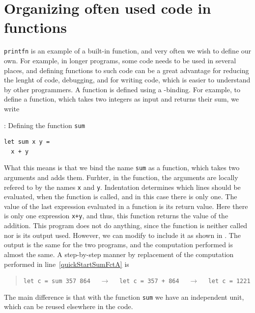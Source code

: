 \documentclass[springer.tex]{subfiles}
\begin{document}
\section{Organizing often used code in functions}
\label{sec:functions}
\lstinline{printfn} is an example of a built-in function, and very often we wish to define our own. For example, in longer programs, some code needs to be used in several places, and defining functions to  such code can be a great advantage for reducing the lenght of code, debugging, and for writing code, which is easier to understand by other programmers. A function is defined using a -binding. For example, to define a function, which takes two integers as input and returns their sum, we write
%
\begin{codeNOutput}[label=sumFunction,
  top=-5pt,
  bottom=-5pt,
  left=-2pt,
  right=-2pt,
]{: Defining the function \lstinline{sum}}
\begin{lstlisting}
let sum x y =
  x + y
\end{lstlisting} 
\end{codeNOutput}
%
What this means is that we bind the name \lstinline{sum} as a function, which takes two arguments and adds them. Furhter, in the function, the arguments are locally refered to by the names \lstinline{x} and \lstinline{y}. Indentation determines which lines should be evaluated, when the function is called, and in this case there is only one. The value of the last expression evaluated in a function is its return value. Here there is only one expression \lstinline{x+y}, and thus, this function returns the value of the addition. This program does not do anything, since the function is neither called nor is its output used. However, we can modify  to include it as shown in .
% 
%
The output is the same for the two programs, and the computation performed is almost the same. A step-by-step manner by replacement of the computation performed in line~\ref{quickStartSumFctA} is
\begin{quote}
  \lstinline{let c = sum 357 864} $\quad\rightarrow\quad$  \lstinline{let c = 357 + 864}  $\quad\rightarrow\quad$  \lstinline{let c = 1221}
\end{quote}
The main difference is that with the function \lstinline{sum} we have an independent unit, which can be reused elsewhere in the code.
\end{document}
